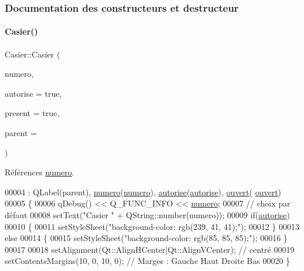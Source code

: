 \subsubsection{Documentation des constructeurs et destructeur}
\mbox{\label{class_casier_a27c0b818ceacb180d031f24d57033d62}} 
\paragraph{\texorpdfstring{Casier()}{Casier()}\hspace{0.1cm}{\footnotesize\ttfamily [1/2]}}
{\footnotesize\ttfamily Casier\+::\+Casier (\begin{DoxyParamCaption}\item[{int}]{numero,  }\item[{bool}]{autorise = {\ttfamily true},  }\item[{bool}]{present = {\ttfamily true},  }\item[{Q\+Widget $\ast$}]{parent = {} }\end{DoxyParamCaption})}



Références \hyperlink{class_casier_a17aa23e73b177559266a9fb17f63b812}{numero}.


\begin{DoxyCode}
00004                                                                       : QLabel(parent), 
      \hyperlink{class_casier_a17aa23e73b177559266a9fb17f63b812}{numero}(\hyperlink{class_casier_a17aa23e73b177559266a9fb17f63b812}{numero}), \hyperlink{class_casier_a2dd9fbe4a93685080a9b5c8f69e3f29a}{autorise}(\hyperlink{class_casier_a2dd9fbe4a93685080a9b5c8f69e3f29a}{autorise}), \hyperlink{class_casier_afe544ed1a87ce714a9fbbe16126669e4}{ouvert}(
      \hyperlink{class_casier_afe544ed1a87ce714a9fbbe16126669e4}{ouvert})
00005 \{
00006     qDebug() << Q\_FUNC\_INFO << \hyperlink{class_casier_a17aa23e73b177559266a9fb17f63b812}{numero};
00007     \textcolor{comment}{// choix par défaut}
00008     setText(\textcolor{stringliteral}{"Casier "} + QString::number(numero));
00009     \textcolor{keywordflow}{if}(\hyperlink{class_casier_a2dd9fbe4a93685080a9b5c8f69e3f29a}{autorise})
00010     \{
00011         setStyleSheet(\textcolor{stringliteral}{"background-color: rgb(239, 41, 41);"});
00012     \}
00013     \textcolor{keywordflow}{else}
00014     \{
00015         setStyleSheet(\textcolor{stringliteral}{"background-color: rgb(85, 85, 85);"});
00016     \}
00017 
00018     setAlignment(Qt::AlignHCenter|Qt::AlignVCenter); \textcolor{comment}{// centré}
00019     setContentsMargins(10, 0, 10, 0); \textcolor{comment}{// Marges : Gauche Haut Droite Bas}
00020 \}
\end{DoxyCode}
\mbox{\label{class_casier_a4aebc2219ccd4612cf79413904bb9340}} 
